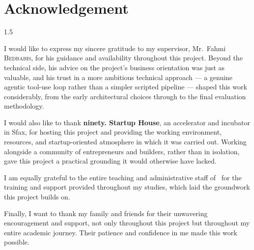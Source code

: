 \chapter*{Acknowledgement}
\thispagestyle{MyStyle}

\begin{spacing}{1.5}{
\selectfont
    I would like to express my sincere gratitude to my supervisor,
    Mr.~Fahmi \textsc{Bedbabis}, for his guidance and availability
    throughout this project. Beyond the technical side, his advice on
    the project's business orientation was just as valuable, and his
    trust in a more ambitious technical approach --- a genuine agentic
    tool-use loop rather than a simpler scripted pipeline --- shaped this
    work considerably, from the early architectural choices through to
    the final evaluation methodology.

    I would also like to thank \textbf{ninety. Startup House}, an
    accelerator and incubator in Sfax, for hosting this project and
    providing the working environment, resources, and startup-oriented
    atmosphere in which it was carried out. Working alongside a
    community of entrepreneurs and builders, rather than in isolation,
    gave this project a practical grounding it would otherwise have
    lacked.

    I am equally grateful to the entire teaching and administrative staff
    of \ecole\ for the training and support provided throughout my
    studies, which laid the groundwork this project builds on.

    Finally, I want to thank my family and friends for their unwavering
    encouragement and support, not only throughout this project but
    throughout my entire academic journey. Their patience and confidence
    in me made this work possible.
}
\end{spacing}
